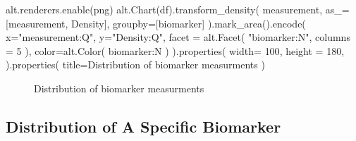 \documentclass[
  letterpaper,
  DIV=11,
  numbers=noendperiod]{scrreprt}
\newenvironment{Shaded}{\begin{snugshade}}{\end{snugshade}}
\newcommand{\DecValTok}[1]{\textcolor[rgb]{0.68,0.00,0.00}{#1}}
\newcommand{\NormalTok}[1]{\textcolor[rgb]{0.00,0.23,0.31}{#1}}
\newcommand{\OperatorTok}[1]{\textcolor[rgb]{0.37,0.37,0.37}{#1}}
\newcommand{\StringTok}[1]{\textcolor[rgb]{0.13,0.47,0.30}{#1}}
\begin{document}
\begin{Shaded}
\begin{Highlighting}[]
\NormalTok{alt.renderers.enable(}\StringTok{\textquotesingle{}png\textquotesingle{}}\NormalTok{)}
\NormalTok{alt.Chart(df).transform\_density(}
    \StringTok{\textquotesingle{}measurement\textquotesingle{}}\NormalTok{,}
\NormalTok{    as\_}\OperatorTok{=}\NormalTok{[}\StringTok{\textquotesingle{}measurement\textquotesingle{}}\NormalTok{, }\StringTok{\textquotesingle{}Density\textquotesingle{}}\NormalTok{],}
\NormalTok{    groupby}\OperatorTok{=}\NormalTok{[}\StringTok{\textquotesingle{}biomarker\textquotesingle{}}\NormalTok{]}
\NormalTok{).mark\_area().encode(}
\NormalTok{    x}\OperatorTok{=}\StringTok{"measurement:Q"}\NormalTok{,}
\NormalTok{    y}\OperatorTok{=}\StringTok{"Density:Q"}\NormalTok{,}
\NormalTok{    facet }\OperatorTok{=}\NormalTok{ alt.Facet(}
        \StringTok{"biomarker:N"}\NormalTok{,}
\NormalTok{        columns }\OperatorTok{=} \DecValTok{5}
\NormalTok{    ),}
\NormalTok{    color}\OperatorTok{=}\NormalTok{alt.Color(}
        \StringTok{\textquotesingle{}biomarker:N\textquotesingle{}}
\NormalTok{    )}
\NormalTok{).properties(}
\NormalTok{    width}\OperatorTok{=} \DecValTok{100}\NormalTok{,}
\NormalTok{    height }\OperatorTok{=} \DecValTok{180}\NormalTok{,}
\NormalTok{).properties(}
\NormalTok{    title}\OperatorTok{=}\StringTok{\textquotesingle{}Distribution of biomarker measurments\textquotesingle{}}
\NormalTok{)}
\end{Highlighting}
\end{Shaded}

\begin{figure}[H]


\caption{\label{fig-dist-biomarker-vals}Distribution of biomarker
measurments}

\end{figure}%

\subsection{Distribution of A Specific
Biomarker}\label{distribution-of-a-specific-biomarker}
\end{document}
